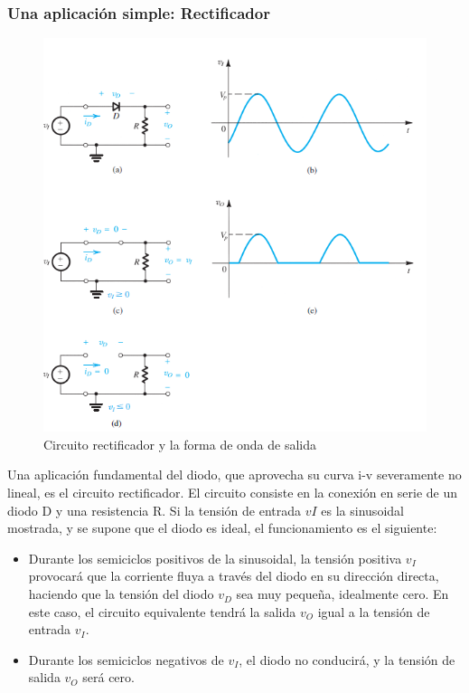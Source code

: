 \subsubsection{Una aplicación simple: Rectificador}


\begin{figure}[H]
    \centering
    \includegraphics[scale=0.6]{Electronica/diodo_f2.png}
    \caption{Circuito rectificador y la forma de onda de salida}
    \label{fig_rectificadorIdeal}
\end{figure}

Una aplicación fundamental del diodo, que aprovecha su curva i-v severamente no lineal, es el circuito rectificador. El circuito consiste en la conexión en serie de un diodo D y una resistencia R. Si la tensión de entrada \( vI \) es la sinusoidal mostrada, y se supone que el diodo es ideal, el funcionamiento es el siguiente:


\begin{itemize}
    \item Durante los semiciclos positivos de la sinusoidal, la tensión positiva \( v_I \) provocará que la corriente fluya a través del diodo en su dirección directa, haciendo que la tensión del diodo \( v_D \) sea muy pequeña, idealmente cero. En este caso, el circuito equivalente tendrá la salida \( v_O \) igual a la tensión de entrada \( v_I \).
    \item Durante los semiciclos negativos de \( v_I \), el diodo no conducirá, y la tensión de salida \( v_O \) será cero.
\end{itemize}


